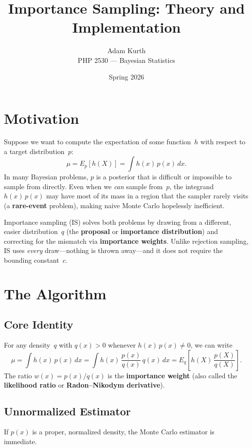 \documentclass[11pt]{article}
\title{Importance Sampling: Theory and Implementation}
\author{Adam Kurth \\ PHP 2530 --- Bayesian Statistics}
\date{Spring 2026}
\begin{document}
\maketitle

\section{Motivation}

Suppose we want to compute the expectation of some function~$h$ with respect to a target distribution~$p$:
\[
  \mu = E_p[h(X)] = \int h(x)\,p(x)\,dx.
\]
In many Bayesian problems, $p$ is a posterior that is difficult or impossible to sample from directly.  Even when we \emph{can} sample from~$p$, the integrand $h(x)\,p(x)$ may have most of its mass in a region that the sampler rarely visits (a \textbf{rare-event} problem), making naive Monte Carlo hopelessly inefficient.

Importance sampling (IS) solves both problems by drawing from a different, easier distribution~$q$ (the \textbf{proposal} or \textbf{importance distribution}) and correcting for the mismatch via \textbf{importance weights}.  Unlike rejection sampling, IS uses \emph{every} draw---nothing is thrown away---and it does not require the bounding constant~$c$.

\section{The Algorithm}

\subsection{Core Identity}

For any density~$q$ with $q(x) > 0$ whenever $h(x)\,p(x) \neq 0$, we can write
\[
  \mu = \int h(x)\,p(x)\,dx
      = \int h(x)\,\frac{p(x)}{q(x)}\,q(x)\,dx
      = E_q\!\left[h(X)\,\frac{p(X)}{q(X)}\right].
\]
The ratio $w(x) = p(x)/q(x)$ is the \textbf{importance weight} (also called the \textbf{likelihood ratio} or \textbf{Radon--Nikodym derivative}).

\subsection{Unnormalized Estimator}

If $p(x)$ is a proper, normalized density, the Monte Carlo estimator is immediate.
\end{document}
